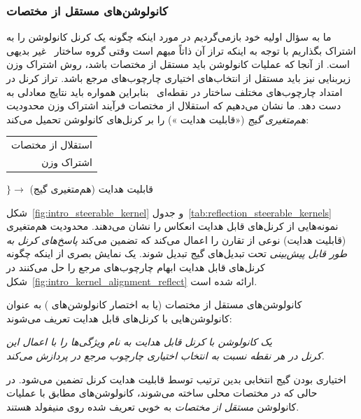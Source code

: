 \subsubsection{کانولوشن‌های مستقل از مختصات }
ما به سؤال اولیه خود بازمی‌گردیم
در مورد اینکه چگونه یک کرنل کانولوشن را به اشتراک بگذاریم با توجه به اینکه تراز آن ذاتاً مبهم است وقتی گروه ساختار~ غیر بدیهی است.
از آنجا که عملیات کانولوشن باید مستقل از مختصات \lr{$\GM$} باشد، روش اشتراک وزن زیربنایی نیز باید مستقل از انتخاب‌های اختیاری چارچوب‌های مرجع باشد.
تراز کرنل در امتداد چارچوب‌های مختلف ساختار  در نقطه‌ای~ بنابراین همواره باید نتایج معادلی به دست دهد.
ما نشان می‌دهیم که استقلال از مختصات \lr{$\GM$} فرآیند اشتراک وزن محدودیت \emph{هم‌متغیری گیج} («قابلیت هدایت ») را بر کرنل‌های کانولوشن تحمیل می‌کند:
\begin{center}
	\begin{tabular}{r@{}}
		استقلال از مختصات \lr{$\mathcal{G}M$} \\[4pt]
		اشتراک وزن
	\end{tabular}
	$\Bigg\} \longrightarrow$ قابلیت هدایت  (هم‌متغیری گیج)
\end{center}
شکل~\ref{fig:intro_steerable_kernel} و جدول~\ref{tab:reflection_steerable_kernels} نمونه‌هایی از کرنل‌های قابل هدایت انعکاس را نشان می‌دهند.
محدودیت هم‌متغیری (قابلیت هدایت) نوعی از تقارن  را اعمال می‌کند که تضمین می‌کند \emph{پاسخ‌های کرنل به طور قابل پیش‌بینی} تحت تبدیل‌های گیج تبدیل شوند.
یک نمایش بصری از اینکه چگونه کرنل‌های قابل هدایت  ابهام چارچوب‌های مرجع را حل می‌کنند در شکل~\ref{fig:intro_kernel_alignment_reflect} ارائه شده است.


\begin{samepage}
	کانولوشن‌های مستقل از مختصات \lr{$\GM$} (یا به اختصار کانولوشن‌های \lr{$\GM$})
	{\setlength{\marginparwidth}{2.5cm}%
		}%
	به عنوان کانولوشن‌هایی با کرنل‌های قابل هدایت  تعریف می‌شوند:
	\begin{center}\it
		یک کانولوشن \lr{$\GM$} با کرنل قابل هدایت  به نام  ویژگی‌ها را با اعمال این \\
		کرنل در هر نقطه  نسبت به انتخاب اختیاری چارچوب مرجع در \lr{$\GpM$} پردازش می‌کند. \\
	\end{center}
\end{samepage}
اختیاری بودن گیج انتخابی بدین ترتیب توسط قابلیت هدایت  کرنل تضمین می‌شود.
در حالی که در مختصات محلی ساخته می‌شوند، 
کانولوشن‌های \lr{$\GM$} مطابق با عملیات کانولوشن \emph{مستقل از مختصات} به خوبی تعریف شده روی منیفولد هستند.



